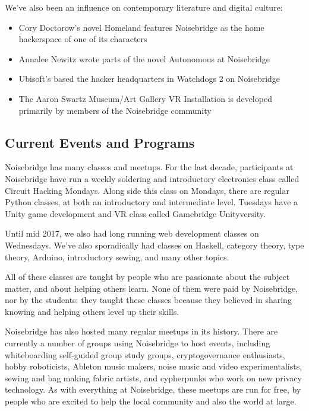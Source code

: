 \documentclass[12pt]{article}
\begin{document}
\vspace{0.5em}

We've also been an influence on contemporary literature and digital culture:

\vspace{0.5em}

\begin{itemize}
    \item Cory Doctorow's novel Homeland features Noisebridge as the home hackerspace of one of its characters
    \item Annalee Newitz wrote parts of the novel Autonomous at Noisebridge
    \item Ubisoft's based the hacker headquarters in Watchdogs 2 on Noisebridge
    \item The Aaron Swartz Museum/Art Gallery VR Installation is developed primarily by members of the Noisebridge community
\end{itemize}

\subsection{Current Events and Programs}

Noisebridge has many classes and meetups. For the last decade, participants at Noisebridge have run a weekly soldering and introductory electronics class called Circuit Hacking Mondays. Along side this class on Mondays, there are regular Python classes, at both an introductory and intermediate level. Tuesdays have a Unity game development and VR class called Gamebridge Unityversity.

Until mid 2017, we also had long running web development classes on Wednesdays. We've also sporadically had classes on Haskell, category theory, type theory, Arduino, introductory sewing, and many other topics.

All of these classes are taught by people who are passionate about the subject matter, and about helping others learn. None of them were paid by Noisebridge, nor by the students: they taught these classes because they believed in sharing knowing and helping others level up their skills.

Noisebridge has also hosted many regular meetups in its history. There are currently a number of groups using Noisebridge to host events, including whiteboarding self-guided group study groups, cryptogovernance enthusiasts, hobby roboticists, Ableton music makers, noise music and video experimentalists, sewing and bag making fabric artists, and cypherpunks who work on new privacy technology. As with everything at Noisebridge, these meetups are run for free, by people who are excited to help the local community and also the world at large.
\end{document}
